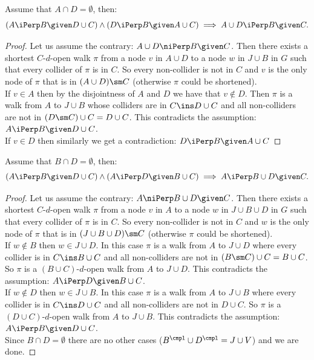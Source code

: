 \begin{Lem} Assume that $A \cap D = \emptyset$, then:
    \[ (A \iPerp  B \given D \cup  C) \land (D \iPerp  B \given A \cup C) \implies A \cup D \iPerp  B \given   C.\]
\begin{proof}
    Let us assume the contrary:  $A \cup D \niPerp  B \given C$.
    Then there exists a shortest $C$-$d$-open walk $\pi$ 
    from a node $v$ in $A \cup D$ to a node $w$ in $J \cup B $ in $G$ such that every collider of $\pi$ is in $C$.
    So every non-collider is not in $C$ and $v$ is 
    the only node of $\pi$ that is in $(A \cup D)\sm C$ (otherwise $\pi$ could be shortened). \\
    If $v \in A$ then by the disjointness of $A$ and $D$ we have that $v \notin D$. 
    Then $\pi$ is a walk from $A$ to $J \cup B$ whose colliders are in $C \ins D \cup C$ 
    and all non-colliders are not in $(D \sm C) \cup C =D \cup C$. This contradicts the assumption: $A \iPerp  B \given D \cup  C$.\\
    If $v \in D$ then similarly we get a contradiction: $D \iPerp  B \given A \cup  C$
\end{proof}
\end{Lem}

\begin{Lem} Assume that $B \cap D = \emptyset$, then:
    \[ (A \iPerp  B \given D \cup  C) \land (A \iPerp  D \given B \cup C) \implies A  \iPerp  B \cup D \given   C.\]
\begin{proof}
    Let us assume the contrary:  $A \niPerp  B \cup D \given C$.
    Then there exists a shortest $C$-$d$-open walk $\pi$ 
    from a node $v$ in $A$ to a node $w$ in $J \cup B \cup D $ in $G$ such that every collider of $\pi$ is in $C$.
    So every non-collider is not in $C$ and $w$ is 
    the only node of $\pi$ that is in $(J \cup B \cup D) \sm C$ (otherwise $\pi$ could be shortened). \\
    If $w \notin B$ then $w \in J \cup D$. In this case $\pi$ is a walk from $A$ to $J \cup D$ where every collider is in
    $C \ins B \cup C$ and all non-colliders are not in $(B\sm C) \cup C = B \cup C$. 
    So $\pi$ is a $(B \cup C)$-$d$-open walk from $A$ to $J \cup D$.
    This contradicts the assumption: $A \iPerp  D \given B \cup C$.\\
    If $w \notin D$ then $w \in J \cup B$. In this case $\pi$ is a walk from $A$ to $J \cup B$ where every collider is in
    $C \ins D \cup C$ and all non-colliders are not in $D \cup C$. 
    So $\pi$ is a $(D \cup C)$-$d$-open walk from $A$ to $J \cup B$.
    This contradicts the assumption: $A \iPerp  B \given D \cup  C$.\\
    Since $B \cap D = \emptyset$ there are no other cases ($B^\cmpl \cup D^\cmpl = J \cup V$) and we are done.
\end{proof}
\end{Lem}

